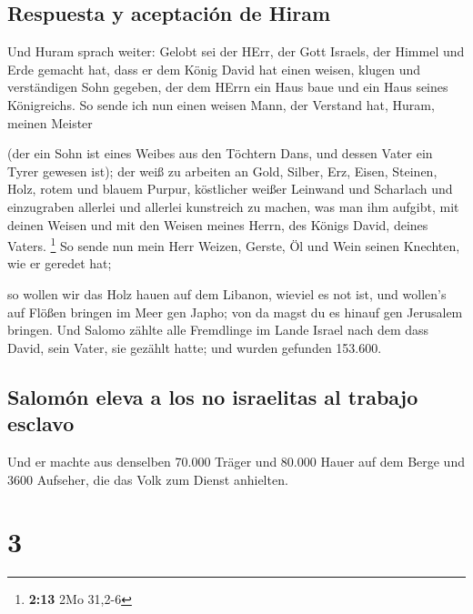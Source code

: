 \hypertarget{respuesta-y-aceptaciuxf3n-de-hiram}{%
\subsection{Respuesta y aceptación de
Hiram}\label{respuesta-y-aceptaciuxf3n-de-hiram}}

 Und Huram sprach weiter: Gelobt sei der HErr, der Gott
Israels, der Himmel und Erde gemacht hat, dass er dem König David hat
einen weisen, klugen und verständigen Sohn gegeben, der dem HErrn ein
Haus baue und ein Haus seines Königreichs.  So sende ich
nun einen weisen Mann, der Verstand hat, Huram, meinen Meister

 (der ein Sohn ist eines Weibes aus den Töchtern Dans,
und dessen Vater ein Tyrer gewesen ist); der weiß zu arbeiten an Gold,
Silber, Erz, Eisen, Steinen, Holz, rotem und blauem Purpur, köstlicher
weißer Leinwand und Scharlach und einzugraben allerlei und allerlei
kunstreich zu machen, was man ihm aufgibt, mit deinen Weisen und mit den
Weisen meines Herrn, des Königs David, deines Vaters. \footnote{\textbf{2:13}
  2Mo 31,2-6}  So sende nun mein Herr Weizen, Gerste, Öl
und Wein seinen Knechten, wie er geredet hat;

 so wollen wir das Holz hauen auf dem Libanon, wieviel es
not ist, und wollen's auf Flößen bringen im Meer gen Japho; von da magst
du es hinauf gen Jerusalem bringen.  Und Salomo zählte
alle Fremdlinge im Lande Israel nach dem dass David, sein Vater, sie
gezählt hatte; und wurden gefunden 153.600.

\hypertarget{salomuxf3n-eleva-a-los-no-israelitas-al-trabajo-esclavo}{%
\subsection{Salomón eleva a los no israelitas al trabajo
esclavo}\label{salomuxf3n-eleva-a-los-no-israelitas-al-trabajo-esclavo}}

 Und er machte aus denselben 70.000 Träger und 80.000
Hauer auf dem Berge und 3600 Aufseher, die das Volk zum Dienst
anhielten.

\hypertarget{section-2}{%
\section{3}\label{section-2}}

